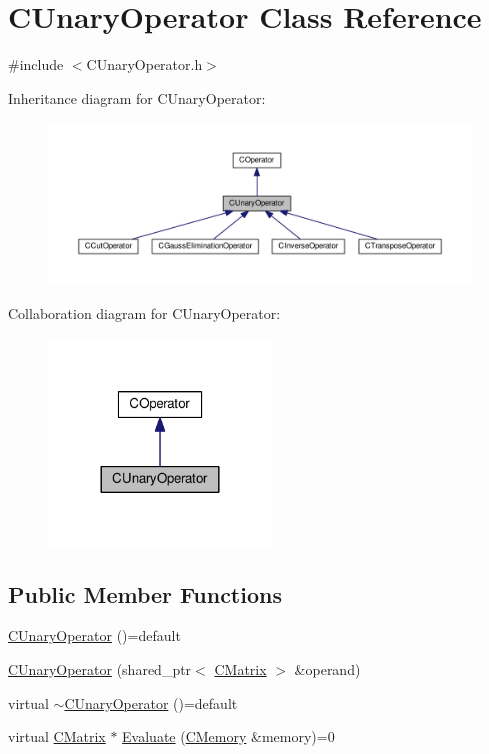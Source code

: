 \hypertarget{classCUnaryOperator}{}\section{C\+Unary\+Operator Class Reference}
\label{classCUnaryOperator}


{\ttfamily \#include $<$C\+Unary\+Operator.\+h$>$}



Inheritance diagram for C\+Unary\+Operator\+:
\nopagebreak
\begin{figure}[H]
\begin{center}
\leavevmode
\includegraphics[width=350pt]{classCUnaryOperator__inherit__graph}
\end{center}
\end{figure}


Collaboration diagram for C\+Unary\+Operator\+:\nopagebreak
\begin{figure}[H]
\begin{center}
\leavevmode
\includegraphics[width=168pt]{classCUnaryOperator__coll__graph}
\end{center}
\end{figure}
\subsection*{Public Member Functions}
\begin{DoxyCompactItemize}
\item 
\hyperlink{classCUnaryOperator_adffd1d4c0bf2cd8f53be92366c5fd520}{C\+Unary\+Operator} ()=default
\item 
\hyperlink{classCUnaryOperator_a2472f6fb06919bbc7c5e460a337cf9d3}{C\+Unary\+Operator} (shared\+\_\+ptr$<$ \hyperlink{classCMatrix}{C\+Matrix} $>$ \&operand)
\item 
virtual \hyperlink{classCUnaryOperator_ae12e63cdb2573b8b6d0470879478f326}{$\sim$\+C\+Unary\+Operator} ()=default
\item 
virtual \hyperlink{classCMatrix}{C\+Matrix} $\ast$ \hyperlink{classCUnaryOperator_a17b01d9de023a58642f6fd82f214cde0}{Evaluate} (\hyperlink{classCMemory}{C\+Memory} \&memory)=0
\end{DoxyCompactItemize}
